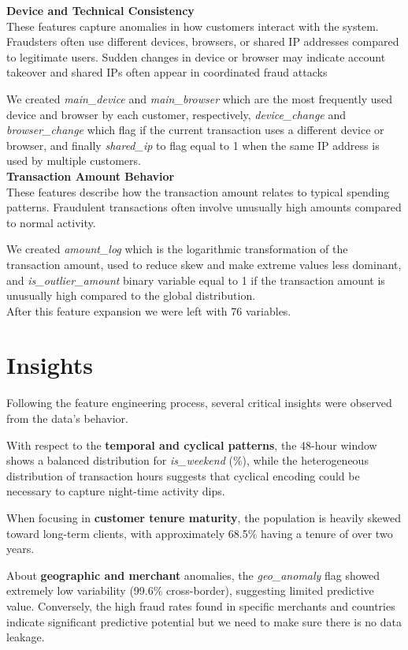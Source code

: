 \documentclass[12pt,a4paper]{report}
\begin{document}
\textbf{Device and Technical Consistency}\\
These features capture anomalies in how customers interact with the system. Fraudsters often use different devices, browsers, or shared IP addresses compared to legitimate users. Sudden changes in device or browser may indicate account takeover and shared IPs often appear in coordinated fraud attacks

We created \textit{main\_device} and  \textit{main\_browser} which are the most frequently used device and browser by each customer, respectively, 
\textit{device\_change} and \textit{browser\_change} which flag if the current transaction uses a different device or browser, and finally 
\textit{shared\_ip} to flag equal to 1 when the same IP address is used by multiple customers.\\

\textbf{Transaction Amount Behavior}\\
These features describe how the transaction amount relates to typical spending patterns. Fraudulent transactions often involve unusually high amounts compared to normal activity.

We created \textit{amount\_log} which is the logarithmic transformation of the transaction amount, used to reduce skew and make extreme values less dominant, and \textit{is\_outlier\_amount} binary variable equal to 1 if the transaction amount is unusually high compared to the global distribution.\\

After this feature expansion we were left with 76 variables.

\section{Insights}
Following the feature engineering process, several critical insights were observed from the data's behavior.

With respect to the \textbf{temporal and cyclical patterns}, the 48-hour window shows a balanced distribution for \textit{is\_weekend} (\%), while the heterogeneous distribution of transaction hours suggests that cyclical encoding could be necessary to capture night-time activity dips.

When focusing in \textbf{customer tenure maturity}, the population is heavily skewed toward long-term clients, with approximately 68.5\% having a tenure of over two years. 

About \textbf{geographic and merchant} anomalies, the \textit{geo\_anomaly} flag showed extremely low variability (99.6\% cross-border), suggesting limited predictive value. Conversely, the high fraud rates found in specific merchants and countries indicate significant predictive potential but we need to make sure there is no data leakage.
\end{document}
